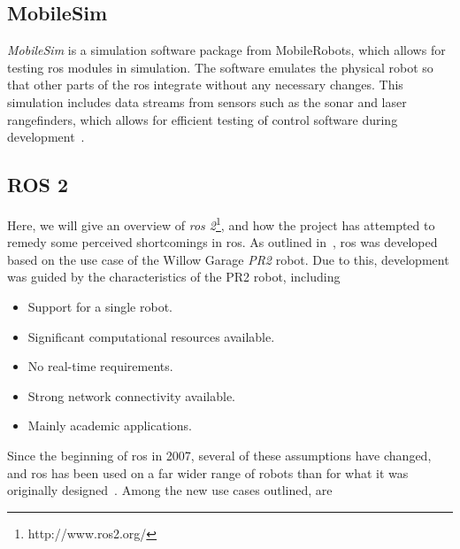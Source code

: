 \documentclass[\rootfolder/main.tex]{subfiles}
\begin{document}
\subsection{MobileSim}

\emph{MobileSim} is a simulation software package from MobileRobots, which allows for testing \acrshort{ros} modules in simulation.
The software emulates the physical robot so that other parts of the \acrshort{ros} integrate without any necessary changes.
This simulation includes data streams from sensors such as the sonar and laser rangefinders, which allows for efficient testing of control software during development~\cite{MobileSim}.


\subsection{ROS 2}

Here, we will give an overview of \emph{\acrshort{ros} 2}\footnote{http://www.ros2.org/}, and how the project has attempted to remedy some perceived shortcomings in \acrshort{ros}.
As outlined in~\cite{Gerkey2017}, \acrshort{ros} was developed based on the use case of the Willow Garage \emph{PR2} robot.
Due to this, development was guided by the characteristics of the PR2 robot, including

\begin{itemize}
    \item Support for a single robot.
    \item Significant computational resources available.
    \item No real-time requirements.
    \item Strong network connectivity available.
    \item Mainly academic applications.
\end{itemize}

Since the beginning of \acrshort{ros} in 2007, several of these assumptions have changed, and \acrshort{ros} has been used on a far wider range of robots than for what it was originally designed~\cite{Gerkey2017}.
Among the new use cases outlined, are
\end{document}
